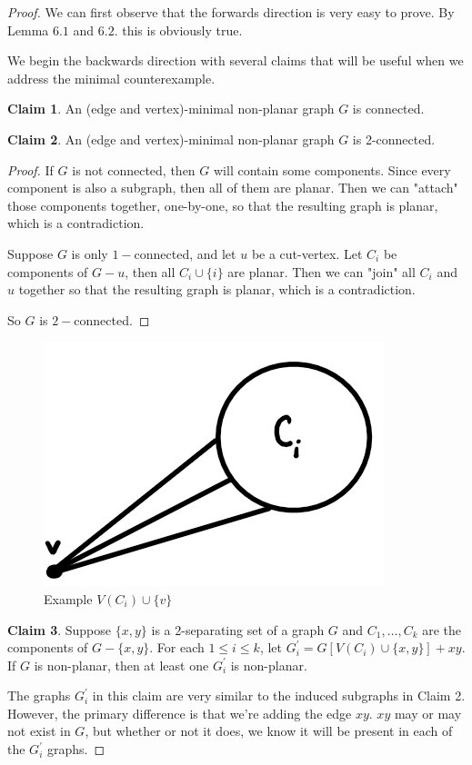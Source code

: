 \documentclass[12pt]{article}
\theoremstyle{definition}
\newtheorem{claim}{Claim}
\begin{document}
\begin{proof}
We can first observe that the forwards direction is very easy to prove. By Lemma $6.1$ and $6.2$. this is obviously true.

We begin the backwards direction with several claims that will be useful when we address the minimal counterexample.
    \begin{greenbox}
        \begin{claim}
            An (edge and vertex)-minimal non-planar graph $G$ is connected.
        \end{claim}
    \end{greenbox}

    \begin{greenbox}
        \begin{claim}
        An (edge and vertex)-minimal non-planar graph $G$ is 2-connected.
        \end{claim}
    \end{greenbox}

    \begin{proof}

        If $G$ is not connected, then $G$ will contain some components. Since every component is also a subgraph, then all of them are planar. Then we can "attach" those components together, one-by-one,  so that the resulting graph is planar, which is a contradiction.

        Suppose $G$ is only $1-$connected, and let $u$ be a cut-vertex. Let $C_i$ be components of $G-u$, then all $C_i \cup \{i\}$ are planar. Then we can "join" all $C_i$ and $u$ together so that the resulting graph is planar, which is a contradiction.

        So $G$ is $2-$connected.

    \end{proof}

    \begin{figure}[hbt!]
        \centering
        \includegraphics[width=0.25\linewidth]{graphs/component_and_v.png}
        \caption{Example $V(C_i) \cup \{v\}$}
    \end{figure}

    \begin{greenbox}
        \begin{claim}
            Suppose $\{x,y\}$ is a 2-separating set of a graph $G$ and $C_1, \ldots, C_k$ are the components of $G - \{x,y\}$. For each $1 \leq i \leq k$, let $G_i^{\prime} = G[V(C_i) \cup \{x,y\}] + xy$. If $G$ is non-planar, then at least one $G_i^{\prime}$ is non-planar.
        \end{claim}
    \end{greenbox}
    \noindent The graphs $G_i^{\prime}$ in this claim are very similar to the induced subgraphs in Claim 2. However, the primary difference is that we're adding the edge $xy$. $xy$ may or may not exist in $G$, but whether or not it does, we know it will be present in each of the $G_i^{\prime}$ graphs.


\end{proof}
\end{document}
